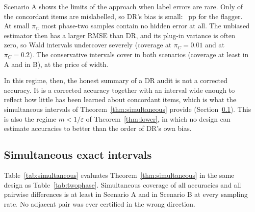Scenario A shows the limits of the approach when label errors are rare. Only \hiddenGptA{} of the \nCA{} concordant items are mislabelled, so DR's bias is small: \drFlagRmseA~pp for the flagger. At small $\pi_C$ most phase-two samples contain no hidden error at all. The unbiased estimator then has a larger RMSE than DR, and its plug-in variance is often zero, so Wald intervals undercover severely (coverage \tpWaldCovOneA{} at $\pi_C=0.01$ and \tpWaldCovTwentyA{} at $\pi_C=0.2$). The conservative intervals cover in both scenarios (coverage at least \tpCpCovMinA{} in A and \tpCpCovMinB{} in B), at the price of width.

In this regime, then, the honest summary of a DR audit is not a corrected accuracy. It is a corrected accuracy together with an interval wide enough to reflect how little has been learned about concordant items, which is what the simultaneous intervals of Theorem~\ref{thm:simultaneous} provide (Section~\ref{sec:emp-sim}). This is also the regime $m<1/\varepsilon$ of Theorem~\ref{thm:lower}, in which no design can estimate accuracies to better than the order of DR's own bias.

\subsection{Simultaneous exact intervals}
\label{sec:emp-sim}

\begin{table}[t]
\centering
\scriptsize

\caption{Simultaneous exact intervals (Theorem~\ref{thm:simultaneous}, $\alpha=0.05$) in the design of Table~\ref{tab:twophase}, over \reps{} phase-two replicates. ``No error sampled'' is the share of replicates in which the concordant sample contains no label error. ``Simult.\ coverage'' is the share of replicates in which every accuracy and every pairwise difference is covered. Widths are means over models (accuracies) and over adjacent pairs of the true ranking. For comparison, ``CP'' is the per-model Clopper--Pearson width and ``Wald cov.'' the range of Wald coverage for the top pairs of Table~\ref{tab:twophase}. ``Certified'' is the share of the \simNadjA{} (A) or \simNadjB{} (B) adjacent pairs whose interval excludes zero; ``wrong'' is the share certified in the wrong direction.}
\label{tab:simultaneous}
\end{table}

Table~\ref{tab:simultaneous} evaluates Theorem~\ref{thm:simultaneous} in the same design as Table~\ref{tab:twophase}. Simultaneous coverage of all accuracies and all pairwise differences is at least \simCovMinA{} in Scenario A and \simCovMinB{} in Scenario B at every sampling rate. No adjacent pair was ever certified in the wrong direction.

